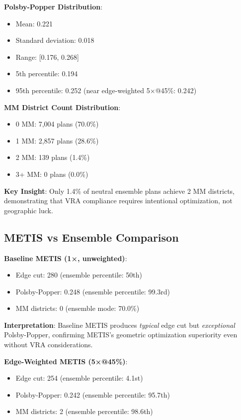 \textbf{Polsby-Popper Distribution}:
\begin{itemize}
    \item Mean: 0.221
    \item Standard deviation: 0.018
    \item Range: [0.176, 0.268]
    \item 5th percentile: 0.194
    \item 95th percentile: 0.252 (near edge-weighted 5×@45\%: 0.242)
\end{itemize}

\textbf{MM District Count Distribution}:
\begin{itemize}
    \item 0 MM: 7,004 plans (70.0\%)
    \item 1 MM: 2,857 plans (28.6\%)
    \item 2 MM: 139 plans (1.4\%)
    \item 3+ MM: 0 plans (0.0\%)
\end{itemize}

\textbf{Key Insight}: Only 1.4\% of neutral ensemble plans achieve 2 MM districts, demonstrating that VRA compliance requires intentional optimization, not geographic luck.

\subsection{METIS vs Ensemble Comparison}

\textbf{Baseline METIS (1×, unweighted)}:
\begin{itemize}
    \item Edge cut: 280 (ensemble percentile: 50th)
    \item Polsby-Popper: 0.248 (ensemble percentile: 99.3rd)
    \item MM districts: 0 (ensemble mode: 70.0\%)
\end{itemize}

\textbf{Interpretation}: Baseline METIS produces \textit{typical} edge cut but \textit{exceptional} Polsby-Popper, confirming METIS's geometric optimization superiority even without VRA considerations.

\textbf{Edge-Weighted METIS (5×@45\%)}:
\begin{itemize}
    \item Edge cut: 254 (ensemble percentile: 4.1st)
    \item Polsby-Popper: 0.242 (ensemble percentile: 95.7th)
    \item MM districts: 2 (ensemble percentile: 98.6th)
\end{itemize}

